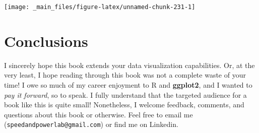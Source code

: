 \documentclass[
]{book}
\begin{document}
\begin{center}\texttt{[image: \_main\_files/figure-latex/unnamed-chunk-231-1]} \end{center}

\hypertarget{conclusions}{%
\chapter{Conclusions}\label{conclusions}}

I sincerely hope this book extends your data visualization capabilities. Or, at the very least, I hope reading through this book was not a complete waste of your time! I owe so much of my career enjoyment to R and \textbf{ggplot2}, and I wanted to \emph{pay it forward}, so to speak. I fully understand that the targeted audience for a book like this is quite small! Nonetheless, I welcome feedback, comments, and questions about this book or otherwise. Feel free to email me (\texttt{speedandpowerlab@gmail.com}) or find me on Linkedin.
\end{document}
